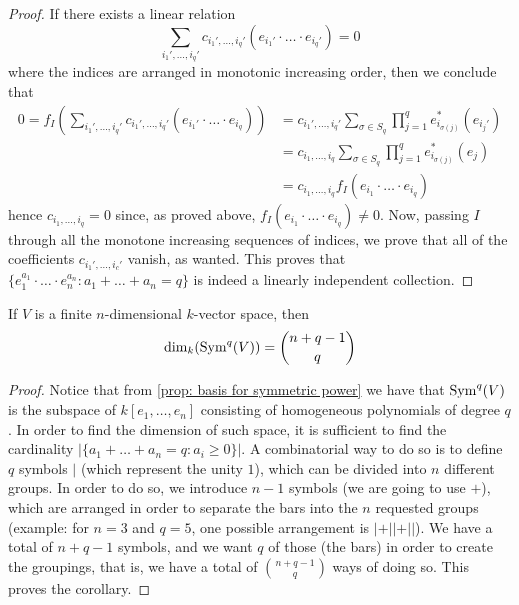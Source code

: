\begin{proof}
  If there exists a linear relation
  \[
    \sum_{i_1', \dots, i_q'} c_{i_1', \dots, i_q'} (e_{i_1'} \cdot \ldots \cdot
    e_{i_q'}) = 0
  \]
  where the indices are arranged in monotonic increasing order, then we conclude
  that
  \begin{align*}
    0 = f_I \left( \sum_{i_1', \dots, i_q'} c_{i_1', \dots, i_q'} (e_{i_1'} \cdot
    \ldots \cdot e_{i_q}) \right)
    &= c_{i_1', \dots, i_q'} \sum_{\sigma \in S_q} \prod_{j=1}^q
    e_{i_{\sigma(j)}}^*(e_{i_j'}) \\
    &= c_{i_1, \dots, i_q} \sum_{\sigma \in S_q} \prod_{j=1}^q
    e_{i_{\sigma(j)}}^*(e_j) \\
    &=  c_{i_1, \dots, i_q} f_I(e_{i_1} \cdot \ldots \cdot e_{i_q})
  \end{align*}
  hence \(c_{i_1, \dots, i_q} = 0\) since, as proved above, \(f_I(e_{i_1} \cdot
  \ldots \cdot e_{i_q}) \neq 0\). Now, passing \(I\) through all the monotone
  increasing sequences of indices, we prove that all of the coefficients
  \(c_{i_1', \dots, i_c'}\) vanish, as wanted. This proves that \(\{e_1^{a_1}
  \cdot \ldots \cdot e_n^{a_n} : a_1 + \dots + a_n = q\}\) is indeed a linearly
  independent collection.
\end{proof}

\begin{corollary}
  If \(V\) is a finite \(n\)-dimensional \(k\)-vector space, then
  \[
    \dim_k(\operatorname{Sym}^q(V)) = \binom{n + q - 1}{q}
  \]
\end{corollary}

\begin{proof}
  Notice that from \cref{prop: basis for symmetric power} we have that
  \(\operatorname{Sym}^q(V)\) is the subspace of \(k[e_1, \dots, e_n]\) consisting of
  homogeneous polynomials of degree \(q\). In order to find the dimension of
  such space, it is sufficient to find the cardinality \(|\{a_1 + \dots + a_n =
  q : a_i \geq 0\}|\). A combinatorial way to do so is to define \(q\)
  symbols \(|\) (which represent the unity \(1\)), which can be divided into
  \(n\) different groups. In order to do so, we introduce \(n - 1\) symbols (we
  are going to use \(+\)), which are arranged in order to separate the bars into
  the \(n\) requested groups (example: for \(n = 3\) and \(q = 5\), one possible
  arrangement is \(| + || + ||\)). We have a total of \(n + q - 1\) symbols, and
  we want \(q\) of those (the bars) in order to create the groupings, that
  is, we have a total of \(\binom{n + q - 1}{q}\) ways of doing so. This proves
  the corollary.
\end{proof}

